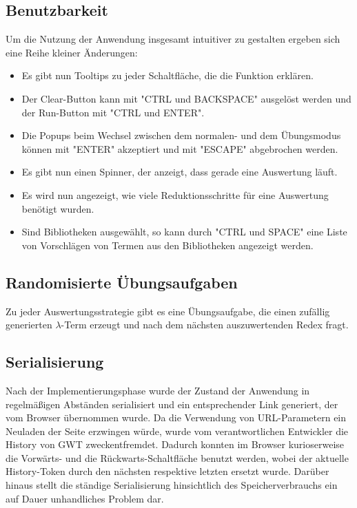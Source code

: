 \documentclass[parskip=full,11pt,openany]{scrreprt}
\begin{document}
\subsection{Benutzbarkeit}
Um die Nutzung der Anwendung insgesamt intuitiver zu gestalten ergeben sich eine Reihe kleiner Änderungen:

\begin{itemize}
\item Es gibt nun Tooltips zu jeder Schaltfläche, die die Funktion erklären.
\item Der Clear-Button kann mit "CTRL und BACKSPACE" ausgelöst werden und der Run-Button mit "CTRL und ENTER".
\item Die Popups beim Wechsel zwischen dem normalen- und dem Übungsmodus können mit "ENTER" akzeptiert und mit
"ESCAPE" abgebrochen werden.
\item Es gibt nun einen Spinner, der anzeigt, dass gerade eine Auswertung läuft.
\item Es wird nun angezeigt, wie viele Reduktionsschritte für eine Auswertung benötigt wurden.
\item Sind Bibliotheken ausgewählt, so kann durch "CTRL und SPACE" eine Liste von Vorschlägen von Termen aus den 
Bibliotheken angezeigt werden.
\end{itemize}

\subsection{Randomisierte Übungsaufgaben}
Zu jeder Auswertungsstrategie gibt es eine Übungsaufgabe, die einen zufällig generierten $\lambda$-Term erzeugt
und nach dem nächsten auszuwertenden Redex fragt.

\subsection{Serialisierung}
Nach der Implementierungsphase wurde der Zustand der Anwendung in regelmäßigen Abständen serialisiert und 
ein entsprechender Link generiert, der vom Browser übernommen wurde.
Da die Verwendung von URL-Parametern ein Neuladen der Seite erzwingen würde, wurde vom verantwortlichen 
Entwickler die History von GWT zweckentfremdet.
Dadurch konnten im Browser kurioserweise die Vorwärts- und die Rückwarts-Schaltfläche benutzt werden, wobei
der aktuelle History-Token durch den nächsten respektive letzten ersetzt wurde.
Darüber hinaus stellt die ständige Serialisierung hinsichtlich des Speicherverbrauchs ein auf Dauer unhandliches
Problem dar.
\end{document}
